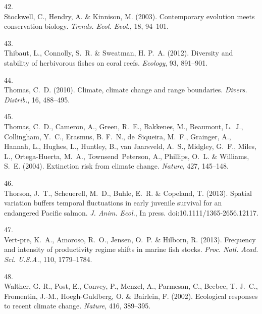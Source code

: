 \documentclass[11pt]{article}
\begin{document}
\begin{spacing}{1.6}
\begin{thebibliography}{50}
42.\\
Stockwell, C., Hendry, A. \& Kinnison, M. (2003).
\newblock Contemporary evolution meets conservation biology.
\newblock \emph{Trends. Ecol. Evol.}, 18, 94--101.

43.\\
Thibaut, L., Connolly, S.~R. \& Sweatman, H. P.~A. (2012).
\newblock Diversity and stability of herbivorous fishes on coral reefs.
\newblock \emph{Ecology}, 93, 891--901.

44.\\
Thomas, C.~D. (2010).
\newblock Climate, climate change and range boundaries.
\newblock \emph{Divers. Distrib.}, 16, 488--495.

45.\\
Thomas, C.~D., Cameron, A., Green, R.~E., Bakkenes, M., Beaumont, L.~J.,
  Collingham, Y.~C., Erasmus, B. F.~N., de~Siqueira, M.~F., Grainger, A.,
  Hannah, L., Hughes, L., Huntley, B., van Jaarsveld, A.~S., Midgley, G.~F.,
  Miles, L., Ortega-Huerta, M.~A., Townsend~Peterson, A., Phillips, O.~L. \&
  Williams, S.~E. (2004).
\newblock Extinction risk from climate change.
\newblock \emph{Nature}, 427, 145--148.

46.\\
Thorson, J.~T., Scheuerell, M.~D., Buhle, E.~R. \& Copeland, T. (2013).
\newblock Spatial variation buffers temporal fluctuations in early juvenile
  survival for an endangered {Pacific} salmon.
\newblock \emph{J. Anim. Ecol.}, In press. doi:10.1111/1365-2656.12117.

47.\\
Vert-pre, K.~A., Amoroso, R.~O., Jensen, O.~P. \& Hilborn, R. (2013).
\newblock Frequency and intensity of productivity regime shifts in marine fish
  stocks.
\newblock \emph{Proc. Natl. Acad. Sci. U.S.A.}, 110, 1779--1784.

48.\\
Walther, G.-R., Post, E., Convey, P., Menzel, A., Parmesan, C., Beebee, T.
  J.~C., Fromentin, J.-M., Hoegh-Guldberg, O. \& Bairlein, F. (2002).
\newblock Ecological responses to recent climate change.
\newblock \emph{Nature}, 416, 389--395.


\end{thebibliography}
\end{spacing}
\end{document}
